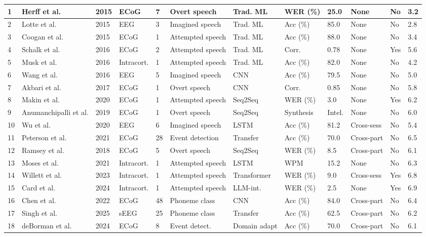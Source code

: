 \documentclass[11pt,a4paper]{article}
\begin{document}
{\begin{longtable}{|p{0.6cm}|p{1.8cm}|p{0.5cm}|p{1.2cm}|p{0.6cm}|p{1.0cm}|p{1.0cm}|p{0.8cm}|p{1.0cm}|p{1.0cm}|p{0.6cm}|p{0.6cm}|}
1 & Herff et al. & 2015 & ECoG & 7 & Overt speech & Trad. ML & WER (\%) & 25.0 & None & No & 3.2 \\
\hline
2 & Lotte et al. & 2015 & EEG & 3 & Imagined speech & Trad. ML & Acc (\%) & 85.0 & None & No & 2.8 \\
\hline
3 & Coogan et al. & 2015 & ECoG & 1 & Attempted speech & Trad. ML & Acc (\%) & 88.0 & None & No & 3.4 \\
\hline
4 & Schalk et al. & 2016 & ECoG & 2 & Attempted speech & Trad. ML & Corr. & 0.78 & None & Yes & 5.6 \\
\hline
5 & Musk et al. & 2016 & Intracort. & 1 & Attempted speech & Trad. ML & Acc (\%) & 82.0 & None & No & 4.2 \\
\hline
6 & Wang et al. & 2016 & EEG & 5 & Imagined speech & CNN & Acc (\%) & 79.5 & None & No & 5.0 \\
\hline
7 & Akbari et al. & 2017 & ECoG & 1 & Overt speech & CNN & Corr. & 0.85 & None & No & 5.8 \\
\hline
8 & Makin et al. & 2020 & ECoG & 1 & Attempted speech & Seq2Seq & WER (\%) & 3.0 & None & Yes & 6.2 \\
\hline
9 & Anumanchipalli et al. & 2019 & ECoG & 1 & Overt speech & Seq2Seq & Synthesis & Intel. & None & No & 6.0 \\
\hline
10 & Wu et al. & 2020 & EEG & 6 & Imagined speech & LSTM & Acc (\%) & 81.2 & Cross-sess & No & 5.4 \\
\hline
11 & Peterson et al. & 2021 & ECoG & 28 & Event detection & Transfer & Acc (\%) & 70.0 & Cross-part & No & 6.5 \\
\hline
12 & Ramsey et al. & 2018 & ECoG & 5 & Overt speech & Seq2Seq & WER (\%) & 8.5 & Cross-part & No & 6.1 \\
\hline
13 & Moses et al. & 2021 & Intracort. & 1 & Attempted speech & LSTM & WPM & 15.2 & None & No & 6.3 \\
\hline
14 & Willett et al. & 2023 & Intracort. & 1 & Attempted speech & Transformer & WER (\%) & 9.0 & Cross-sess & Yes & 6.8 \\
\hline
15 & Card et al. & 2024 & Intracort. & 1 & Attempted speech & LLM-int. & WER (\%) & 2.5 & None & Yes & 6.9 \\
\hline
16 & Chen et al. & 2022 & ECoG & 48 & Phoneme class & CNN & Acc (\%) & 84.0 & Cross-part & No & 6.4 \\
\hline
17 & Singh et al. & 2025 & sEEG & 25 & Phoneme class & Transfer & Acc (\%) & 62.5 & Cross-part & No & 6.2 \\
\hline
18 & deBorman et al. & 2024 & ECoG & 8 & Event detect. & Domain adapt & Acc (\%) & 70.0 & Cross-part & No & 6.1 \\

\end{longtable}}
\end{document}
